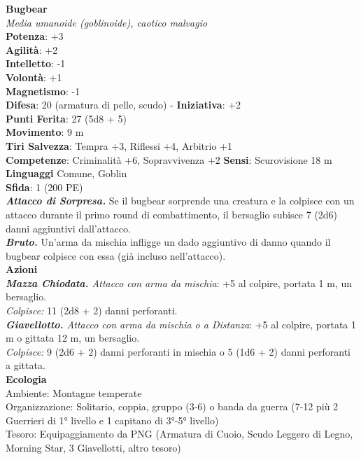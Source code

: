 \begin{multicols}{2}
\medskip\textbf{Bugbear}\\
\emph{Media umanoide (goblinoide), caotico malvagio}\\
\textbf{Potenza}: +3\\
\textbf{Agilità}: +2\\
\textbf{Intelletto}: -1\\
\textbf{Volontà}: +1\\
\textbf{Magnetismo}: -1\\
\textbf{Difesa}: 20 (armatura di pelle, scudo) - \textbf{Iniziativa}: +2\\
\textbf{Punti Ferita}: 27 (5d8 + 5)\\
\textbf{Movimento}: 9 m\\
\textbf{Tiri Salvezza}: Tempra +3, Riflessi +4, Arbitrio +1\\
\textbf{Competenze}: Criminalità +6, Sopravvivenza +2
\textbf{Sensi}: Scurovisione 18 m \\
\textbf{Linguaggi} Comune, Goblin\\
\textbf{Sfida}: 1 (200 PE)\smallskip\\
\emph{\textbf{Attacco di Sorpresa.}} Se il bugbear sorprende una creatura e la colpisce con un attacco durante il primo round di combattimento, il bersaglio subisce 7 (2d6) danni aggiuntivi dall'attacco.\\
\emph{\textbf{Bruto.}} Un'arma da mischia infligge un dado aggiuntivo di danno quando il bugbear colpisce con essa (già incluso nell'attacco).\\
\smallskip\textbf{Azioni}\\
\emph{\textbf{Mazza Chiodata.} Attacco con arma da mischia}: +5 al colpire, portata 1 m, un bersaglio.\\
\emph{Colpisce:} 11 (2d8 + 2) danni perforanti.\\
\emph{\textbf{Giavellotto.} Attacco con arma da mischia o a Distanza}: +5 al colpire, portata 1 m o gittata 12 m, un bersaglio.\\
\emph{Colpisce:} 9 (2d6 + 2) danni perforanti in mischia o 5 (1d6 + 2) danni perforanti a gittata.\\
\textbf{Ecologia}\\
Ambiente: Montagne temperate\\
Organizzazione: Solitario, coppia, gruppo (3-6) o banda da guerra (7-12 più 2 Guerrieri di 1° livello e 1 capitano di 3°-5° livello)\\
Tesoro: Equipaggiamento da PNG (Armatura di Cuoio, Scudo Leggero di Legno, Morning Star, 3 Giavellotti, altro tesoro)\\

\end{multicols}
